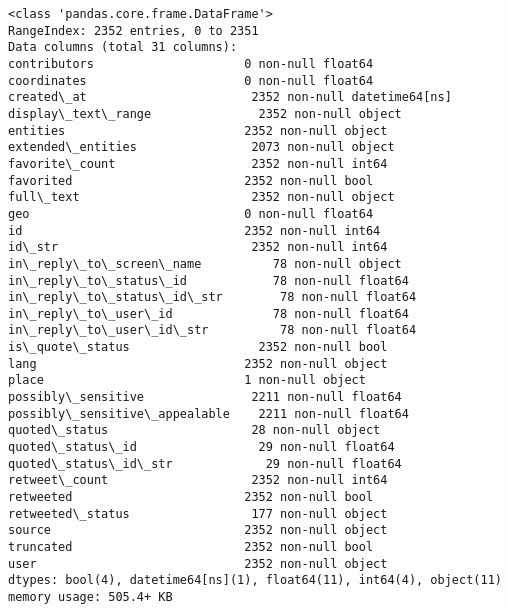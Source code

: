 \documentclass[11pt]{article}
\begin{document}
    \begin{Verbatim}[commandchars=\\\{\}]
<class 'pandas.core.frame.DataFrame'>
RangeIndex: 2352 entries, 0 to 2351
Data columns (total 31 columns):
contributors                     0 non-null float64
coordinates                      0 non-null float64
created\_at                       2352 non-null datetime64[ns]
display\_text\_range               2352 non-null object
entities                         2352 non-null object
extended\_entities                2073 non-null object
favorite\_count                   2352 non-null int64
favorited                        2352 non-null bool
full\_text                        2352 non-null object
geo                              0 non-null float64
id                               2352 non-null int64
id\_str                           2352 non-null int64
in\_reply\_to\_screen\_name          78 non-null object
in\_reply\_to\_status\_id            78 non-null float64
in\_reply\_to\_status\_id\_str        78 non-null float64
in\_reply\_to\_user\_id              78 non-null float64
in\_reply\_to\_user\_id\_str          78 non-null float64
is\_quote\_status                  2352 non-null bool
lang                             2352 non-null object
place                            1 non-null object
possibly\_sensitive               2211 non-null float64
possibly\_sensitive\_appealable    2211 non-null float64
quoted\_status                    28 non-null object
quoted\_status\_id                 29 non-null float64
quoted\_status\_id\_str             29 non-null float64
retweet\_count                    2352 non-null int64
retweeted                        2352 non-null bool
retweeted\_status                 177 non-null object
source                           2352 non-null object
truncated                        2352 non-null bool
user                             2352 non-null object
dtypes: bool(4), datetime64[ns](1), float64(11), int64(4), object(11)
memory usage: 505.4+ KB

    \end{Verbatim}
\end{document}
